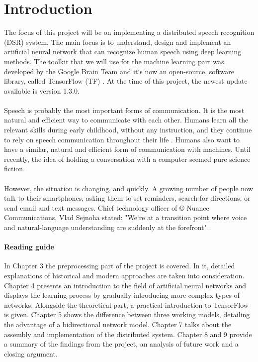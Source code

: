 \chapter{Introduction}\label{ch:introduction}
The focus of this project will be on implementing a distributed speech recognition (DSR) system.
The main focus is to understand, design and implement an artificial neural network that can recognize human speech using deep learning methods.
The toolkit that we will use for the machine learning part was developed by the Google Brain Team and it`s now an open-source, software library, called TensorFlow (TF) \cite{tensorflow2015-whitepaper}.
At the time of this project, the newest update available is version 1.3.0.\\\\
Speech is probably the most important forms of communication.
It is the most natural and efficient way to communicate with
each other. Humans learn all the relevant skills during early
childhood, without any instruction, and they continue to rely
on speech communication throughout their life \cite{kamblespeech}.
Humans also want to have a similar, natural and efficient form of communication with machines. 
Until recently, the idea of holding a conversation with a computer seemed pure science fiction.\\\\
However, the situation is changing, and quickly.
A growing number of people now talk to their smartphones, asking them to set reminders, search for directions, or send email and text messages.
Chief technology officer of \copyright{} Nuance Communications, Vlad Sejnoha stated: "We`re at a transition point where voice and natural-language understanding are suddenly at the forefront" \cite{kamblespeech}.\\

\subsubsection{Reading guide}
In Chapter 3 the preprocessing part of the project is covered. In it, detailed explanations of historical and modern approaches are taken into consideration. Chapter 4 presents an introduction to the field of artificial neural networks and displays the learning process by gradually introducing more complex types of networks. Alongside the theoretical part, a practical introduction to TensorFlow is given. Chapter 5 shows the difference between three working models, detailing the advantage of a bidirectional network model. Chapter 7 talks about the assembly and implementation of the distributed system. Chapter 8 and 9 provide a summary of the findings from the project, an analysis of future work and a closing argument. 
